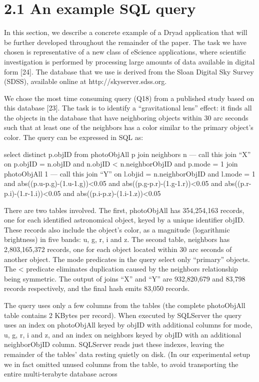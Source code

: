 \documentclass[
]{article}
\begin{document}
\section{2.1 An example SQL query}\label{an-example-sql-query}

In this section, we describe a concrete example of a Dryad application
that will be further developed throughout the remainder of the paper.
The task we have chosen is representative of a new class of eScience
applications, where scientific investigation is performed by processing
large amounts of data available in digital form {[}24{]}. The database
that we use is derived from the Sloan Digital Sky Survey (SDSS),
available online at http://skyserver.sdss.org.

We chose the most time consuming query (Q18) from a published study
based on this database {[}23{]}. The task is to identify a
``gravitational lens'' effect: it finds all the objects in the database
that have neighboring objects within 30 arc seconds such that at least
one of the neighbors has a color similar to the primary object's color.
The query can be expressed in SQL as:

select distinct p.objID from photoObjAll p join neighbors n --- call
this join ``X'' on p.objID = n.objID and n.objID \textless{}
n.neighborObjID and p.mode = 1 join photoObjAll 1 --- call this join
``Y'' on l.objid = n.neighborObjID and l.mode = 1 and
abs((p.u-p.g)-(1.u-1.g))\textless0.05 and
abs((p.g-p.r)-(1.g-1.r))\textless0.05 and
abs((p.r-p.i)-(1.r-1.i))\textless0.05 and
abs((p.i-p.z)-(1.i-1.z))\textless0.05

There are two tables involved. The first, photoObjAll has 354,254,163
records, one for each identified astronomical object, keyed by a unique
identifier objID. These records also include the object's color, as a
magnitude (logarithmic brightness) in five bands: u, g, r, i and z. The
second table, neighbors has 2,803,165,372 records, one for each object
located within 30 arc seconds of another object. The mode predicates in
the query select only ``primary'' objects. The \textless{} predicate
eliminates duplication caused by the neighbors relationship being
symmetric. The output of joins ``X'' and ``Y'' are 932,820,679 and
83,798 records respectively, and the final hash emits 83,050 records.

The query uses only a few columns from the tables (the complete
photoObjAll table contains 2 KBytes per record). When executed by
SQLServer the query uses an index on photoObjAll keyed by objID with
additional columns for mode, u, g, r, i and z, and an index on neighbors
keyed by objID with an additional neighborObjID column. SQLServer reads
just these indexes, leaving the remainder of the tables' data resting
quietly on disk. (In our experimental setup we in fact omitted unused
columns from the table, to avoid transporting the entire multi-terabyte
database across
\end{document}
